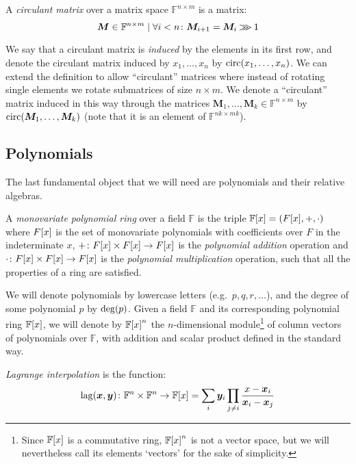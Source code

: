 \begin{definition}
  A \emph{circulant matrix} over a matrix space \(\mathbb{F}^{n \times m}\) is a matrix: 
  \[\bm{M} \in \mathbb{F}^{n \times m} \mid \forall i < n\colon \bm{M}_{i+1} = \bm{M}_i \mathbin{\ggg} 1\]
\end{definition}

We say that a circulant matrix is \emph{induced} by the elements in its first row, and denote 
the circulant matrix induced by \(x_1, \dots, x_n\) by \(\call{\circulant}{x_1, \dots, x_n}\).
We can extend the definition to allow ``circulant'' matrices where instead of rotating single 
elements we rotate submatrices of size \(n \times m\). 
We denote a ``circulant'' matrix induced in this way through the matrices 
\(\bm{M}_1, \dots, \bm{M}_k \in \mathbb{F}^{n \times m}\) by 
\(\call{\circulant}{\bm{M}_1, \dots, \bm{M}_k}\) (note that it is an element of 
\(\mathbb{F}^{nk \times mk}\)).

\subsection{Polynomials}
The last fundamental object that we will need are polynomials and their relative algebras. 
\begin{definition}
  A \emph{monovariate polynomial ring} over a field \(\mathbb{F}\) is the triple 
  \(\extend{\mathbb{F}}{x} = \Tuple{\extend{F}{x}, +, \cdot}\) where \(\extend{F}{x}\) is the set 
  of monovariate polynomials with coefficients over \(F\) in the indeterminate \(x\), 
  \(+\colon \extend{F}{x} \times \extend{F}{x} \to \extend{F}{x}\) is the \emph{polynomial addition}
  operation and \(\cdot\colon \extend{F}{x} \times \extend{F}{x} \to \extend{F}{x}\) is the
  \emph{polynomial multiplication} operation, such that all the properties of a ring are satisfied.
\end{definition}

We will denote polynomials by lowercase letters (e.g.\  \(p, q, r, \dots \)), and the degree of 
some polynomial \(p\) by \(\call{\deg}{p}\).
Given a field \(\mathbb{F}\) and its corresponding polynomial ring \(\extend{\mathbb{F}}{x}\), 
we will denote by \(\extend{\mathbb{F}}{x}^n\) the \(n\)-dimensional module\footnote{Since 
\(\extend{\mathbb{F}}{x}\) is a commutative ring, \(\extend{\mathbb{F}}{x}^n\) is not a vector 
space, but we will nevertheless call its elements `vectors' for the sake of simplicity.} of 
column vectors of polynomials over \(\mathbb{F}\), with addition and scalar product defined in the 
standard way.
\begin{definition}
  \emph{Lagrange interpolation} is the function:
  \[
    \call{\lagrange}{\bm{x}, \bm{y}}\colon \mathbb{F}^n \times \mathbb{F}^n \to \extend{\mathbb{F}}{x} = 
    \sum_{i}{\bm{y}_i\prod_{j \neq i}{\frac{x - \bm{x}_i}{\bm{x}_i - \bm{x}_j}}}
  \]
\end{definition}

